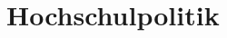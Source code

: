 \documentclass[]{papertex}
\begin{document}

	
	
	\newpage
	\section{Hochschulpolitik}
		\label{politik}
		\begin{multicols}{2}
		
		
		\end{multicols}
	\newpage
\end{document}
